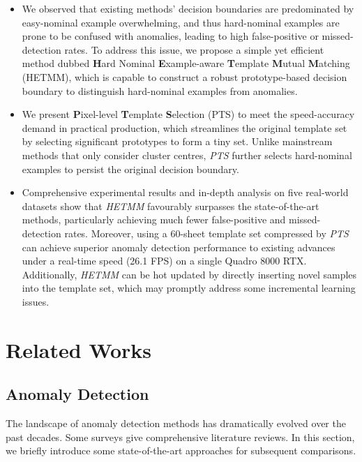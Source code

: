 \documentclass[default,iicol]{sn-jnl}\usepackage[algo2e,ruled,linesnumbered]{algorithm2e}
\theoremstyle{thmstyleone}\newtheorem{theorem}{Theorem}\newtheorem{proposition}[theorem]{Proposition}
\theoremstyle{thmstyletwo}\newtheorem{example}{Example}\newtheorem{remark}{Remark}
\theoremstyle{thmstylethree}\newtheorem{definition}{Definition}
\begin{document}
\begin{itemize}
    \item We observed that existing methods' decision boundaries are predominated by easy-nominal example overwhelming, and thus hard-nominal examples are prone to be confused with anomalies, leading to high false-positive or missed-detection rates.
    To address this issue, we propose a simple yet efficient method dubbed \textbf{H}ard Nominal \textbf{E}xample-aware \textbf{T}emplate \textbf{M}utual \textbf{M}atching (HETMM), which is capable to construct a robust prototype-based decision boundary to distinguish hard-nominal examples from anomalies.
    
    \item We present \textbf{P}ixel-level \textbf{T}emplate \textbf{S}election (PTS) to meet the speed-accuracy demand in practical production, which streamlines the original template set by selecting significant prototypes to form a tiny set.
    Unlike mainstream methods that only consider cluster centres, \textit{PTS} further selects hard-nominal examples to persist the original decision boundary.

    \item Comprehensive experimental results and in-depth analysis on five real-world datasets show that \textit{HETMM} favourably surpasses the state-of-the-art methods, particularly achieving much fewer false-positive and missed-detection rates.
    Moreover, using a 60-sheet template set compressed by \textit{PTS} can achieve superior anomaly detection performance to existing advances under a real-time speed (26.1 FPS) on a single Quadro 8000 RTX.
    Additionally, \textit{HETMM} can be hot updated by directly inserting novel samples into the template set, which may promptly address some incremental learning issues.
    
\end{itemize}

\section{Related Works}\label{RW}
\subsection{Anomaly Detection}
The landscape of anomaly detection methods has dramatically evolved over the past decades.
Some surveys \cite{survey2014, survey2019, surveyDL2019} give comprehensive literature reviews.
In this section, we briefly introduce some state-of-the-art approaches for subsequent comparisons.
\end{document}
